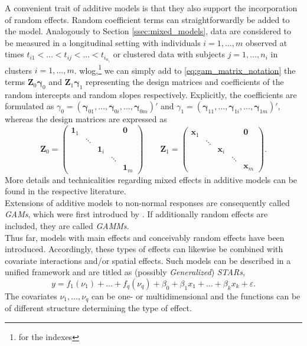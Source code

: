 A convenient trait of additive models is that they also support the incorporation of random effects. Random coefficient terms can straightforwardly be added to the model.
Analogously to Section \ref{ssec:mixed_models}, data are considered to be measured in a longitudinal setting with individuals  $i=1, \ldots, m$ observed at times $t_{i1} < \ldots < t_{ij} < \ldots < t_{i_{n_i}}$ or clustered data with subjects $j=1, \ldots, n_i$ in clusters $i=1, \ldots, m$. \Ac{wlog},\footnote{for the indexes} we can simply add to \autoref{eq:gam_matrix_notation} the terms $\bm{Z}_0 \bm{\gamma}_0$ and $\bm{Z}_1 \bm{\gamma}_1$ representing the design matrices and coefficients of the random intercepts and random slopes respectively. Explicitly, the coefficients are formulated as $\gamma_{0}=\left(\bm{\gamma}_{01}, \ldots, \bm{\gamma}_{0 i}, \ldots, \bm{\gamma}_{0 m}\right)'$ and $\gamma_{1}=\left(\bm{\gamma}_{11}, \ldots, \bm{\gamma}_{1 i}, \ldots, \bm{\gamma}_{1 m}\right)'$, whereas the design matrices are expressed as
$$
\bm{Z}_0 =
\left(
\begin{matrix}
\bm{1}_1 &  &  &  & \bm{0} \\ 
 & \ddots &  &  &  \\ 
 &  & \bm{1}_i &  &  \\ 
 &  &  & \ddots &  \\ 
 &  &  &  & \bm{1}_m
\end{matrix} 
\right)
\qquad
\bm{Z}_1 =
\left(
\begin{matrix}
\bm{x}_1 &  &  &  & \bm{0} \\ 
 & \ddots &  &  &  \\ 
 &  & \bm{x}_i &  &  \\ 
 &  &  & \ddots &  \\ 
 &  &  &  & \bm{x}_m
\end{matrix} 
\right).
$$
More details and technicalities regarding mixed effects in additive models can be found in the respective literature.\\


Extensions of additive models to non-normal responses are consequently called \textit{\acp{GAM}}, which were first introducd by \cite{hastie1986}. If additionally random effects are included, they are called \textit{\acp{GAMM}}.\\

Thus far, models with main effects and conceivably random effects have been introduced. Accordingly, these types of effects can likewise be combined with covariate interactions and/or spatial effects. Such models can be described in a unified framework and are titled as (possibly \textit{Generalized}) \textit{\acp{STAR}},
$$
y=f_{1}\left(\nu_{1}\right)+\ldots+f_{q}\left(\nu_{q}\right)+\beta_{0}+\beta_{1} x_{1}+\ldots+\beta_{k} x_{k}+\varepsilon.
$$
The covariates $\nu_1, \ldots, \nu_q$ can be one- or multidimensional and the functions can be of different structure determining the type of effect.




